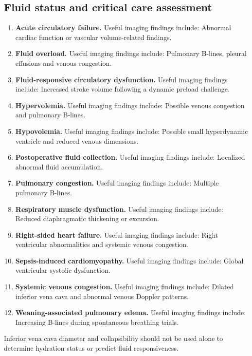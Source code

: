 \subsection{Fluid status and critical care assessment}
\begin{enumerate}[leftmargin=*,itemsep=0.45em,topsep=0.4em]
\item \textbf{Acute circulatory failure.} Useful imaging findings include: Abnormal cardiac function or vascular volume-related findings.
\item \textbf{Fluid overload.} Useful imaging findings include: Pulmonary B-lines, pleural effusions and venous congestion.
\item \textbf{Fluid-responsive circulatory dysfunction.} Useful imaging findings include: Increased stroke volume following a dynamic preload challenge.
\item \textbf{Hypervolemia.} Useful imaging findings include: Possible venous congestion and pulmonary B-lines.
\item \textbf{Hypovolemia.} Useful imaging findings include: Possible small hyperdynamic ventricle and reduced venous dimensions.
\item \textbf{Postoperative fluid collection.} Useful imaging findings include: Localized abnormal fluid accumulation.
\item \textbf{Pulmonary congestion.} Useful imaging findings include: Multiple pulmonary B-lines.
\item \textbf{Respiratory muscle dysfunction.} Useful imaging findings include: Reduced diaphragmatic thickening or excursion.
\item \textbf{Right-sided heart failure.} Useful imaging findings include: Right ventricular abnormalities and systemic venous congestion.
\item \textbf{Sepsis-induced cardiomyopathy.} Useful imaging findings include: Global ventricular systolic dysfunction.
\item \textbf{Systemic venous congestion.} Useful imaging findings include: Dilated inferior vena cava and abnormal venous Doppler patterns.
\item \textbf{Weaning-associated pulmonary edema.} Useful imaging findings include: Increasing B-lines during spontaneous breathing trials.
\end{enumerate}
Inferior vena cava diameter and collapsibility should not be used alone to determine hydration status or predict fluid responsiveness.

